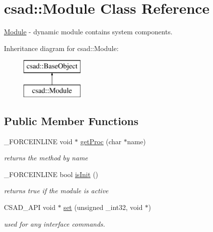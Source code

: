 \hypertarget{classcsad_1_1_module}{\section{csad\-:\-:Module Class Reference}
\label{classcsad_1_1_module}
}


\hyperlink{classcsad_1_1_module}{Module} -\/ dynamic module contains system components.  


Inheritance diagram for csad\-:\-:Module\-:\begin{figure}[H]
\begin{center}
\leavevmode
\includegraphics[height=2.000000cm]{classcsad_1_1_module}
\end{center}
\end{figure}
\subsection*{Public Member Functions}
\begin{DoxyCompactItemize}
\item 
\hypertarget{classcsad_1_1_module_acec7f78a1e05c61c6670e77684a9949d}{\-\_\-\-F\-O\-R\-C\-E\-I\-N\-L\-I\-N\-E void $\ast$ \hyperlink{classcsad_1_1_module_acec7f78a1e05c61c6670e77684a9949d}{get\-Proc} (char $\ast$name)}\label{classcsad_1_1_module_acec7f78a1e05c61c6670e77684a9949d}

\begin{DoxyCompactList}\small\item\em returns the method by name \end{DoxyCompactList}\item 
\hypertarget{classcsad_1_1_module_ab36b4578493a32edd48eb3007540ef47}{\-\_\-\-F\-O\-R\-C\-E\-I\-N\-L\-I\-N\-E bool \hyperlink{classcsad_1_1_module_ab36b4578493a32edd48eb3007540ef47}{is\-Init} ()}\label{classcsad_1_1_module_ab36b4578493a32edd48eb3007540ef47}

\begin{DoxyCompactList}\small\item\em returns true if the module is active \end{DoxyCompactList}\item 
\hypertarget{classcsad_1_1_module_af65981fd5d57f26c0afe612ead88bb21}{C\-S\-A\-D\-\_\-\-A\-P\-I void $\ast$ \hyperlink{classcsad_1_1_module_af65981fd5d57f26c0afe612ead88bb21}{set} (unsigned \-\_\-int32, void $\ast$)}\label{classcsad_1_1_module_af65981fd5d57f26c0afe612ead88bb21}

\begin{DoxyCompactList}\small\item\em used for any interface commands. \end{DoxyCompactList}\end{DoxyCompactItemize}
